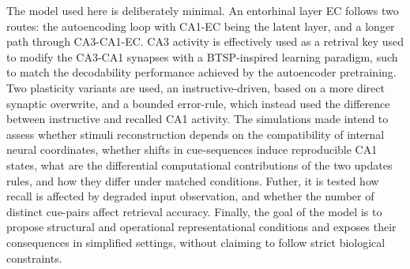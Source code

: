 The model used here is deliberately minimal.
An entorhinal layer EC follows two routes: the autoencoding loop with CA1-EC being the latent layer, and a longer path through CA3-CA1-EC.
CA3 activity is effectively used as a retrival key used to modify the CA3-CA1 synapses with a BTSP-inspired learning paradigm, such to match the decodability performance achieved by the autoencoder pretraining.
Two plasticity variants are used, an instructive-driven, based on a more direct synaptic overwrite, and a bounded error-rule, which instead used the difference between instructive and recalled CA1 activity.
The simulations made intend to assess whether stimuli reconstruction depends on the compatibility of internal neural coordinates, whether shifts in cue-sequences induce reproducible CA1 states, what are the differential computational contributions of the two updates rules, and how they differ under
matched conditions.
Futher, it is tested how recall is affected by degraded input observation, and whether the number of distinct cue-pairs affect retrieval accuracy.
Finally, the goal of the model is to propose structural and operational representational conditions and exposes their consequences in simplified settings, without claiming to follow strict biological constraints. 




